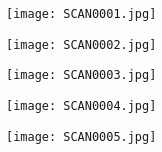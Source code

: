 \documentclass[letterpaper,12pt,oneside]{report}
\begin{document}
\begin{figure}[h]
	\centering
	\texttt{[image: SCAN0001.jpg]}
\end{figure}
\newpage
\begin{figure}[h]
	\centering
	\texttt{[image: SCAN0002.jpg]}
\end{figure}
\newpage
\begin{figure}[h]
	\centering
	\texttt{[image: SCAN0003.jpg]}
\end{figure}
\newpage
\begin{figure}[h]
	\centering
	\texttt{[image: SCAN0004.jpg]}
\end{figure}
\newpage
\begin{figure}[h]
	\centering
	\texttt{[image: SCAN0005.jpg]}
\end{figure}
\end{document}
